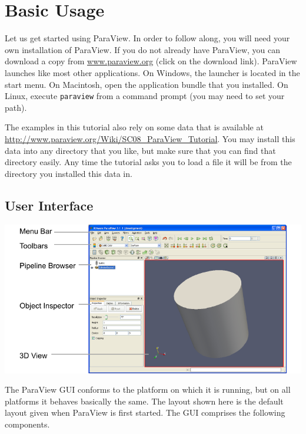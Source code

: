 \chapter{Basic Usage}
\label{chap:BasicUsage}

Let us get started using ParaView.  In order to follow along, you will need
your own installation of ParaView.  If you do not already have ParaView,
you can download a copy from
\href{http://www.paraview.org}{www.paraview.org} (click on the download
link).  ParaView launches like most other applications.  On Windows, the
launcher is located in the start menu.  On Macintosh, open the application
bundle that you installed.  On Linux, execute \texttt{paraview} from a
command prompt (you may need to set your path).

The examples in this tutorial also rely on some data that is available at
\href{http://www.paraview.org/Wiki/SC08_ParaView_Tutorial}{http://www.paraview.org/Wiki/SC08\_ParaView\_Tutorial}.
You may install this data into any directory that you like, but make sure
that you can find that directory easily.  Any time the tutorial asks you to
load a file it will be from the directory you installed this data in.


\section{User Interface}

\begin{inlinefig}
  \includegraphics{images/UserInterface}
\end{inlinefig}

The ParaView GUI conforms to the platform on which it is running, but on
all platforms it behaves basically the same.  The layout shown here is the
default layout given when ParaView is first started.  The GUI comprises the
following components.

